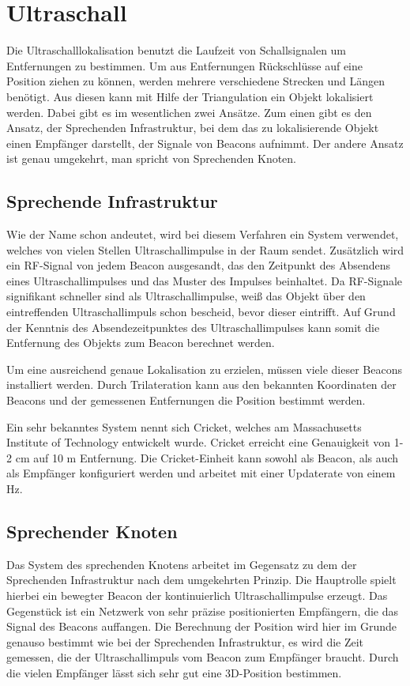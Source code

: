 \chapter{Ultraschall}
Die Ultraschalllokalisation benutzt die Laufzeit von Schallsignalen um
Entfernungen zu bestimmen. Um aus Entfernungen Rückschlüsse auf eine
Position ziehen zu können, werden mehrere verschiedene Strecken und Längen
benötigt. Aus diesen kann mit Hilfe der Triangulation ein Objekt lokalisiert
werden. Dabei gibt es im wesentlichen zwei Ansätze. Zum einen gibt es den
Ansatz, der \dq Sprechenden Infrastruktur\dq, bei dem das zu lokalisierende Objekt
einen Empfänger darstellt, der Signale von Beacons aufnimmt. Der andere
Ansatz ist genau umgekehrt, man spricht von \dq Sprechenden Knoten\dq.

\section{Sprechende Infrastruktur}
Wie der Name schon andeutet, wird bei diesem Verfahren ein System verwendet,
welches von vielen Stellen Ultraschallimpulse in der Raum sendet. Zusätzlich
wird ein RF-Signal von jedem Beacon ausgesandt, das den Zeitpunkt des
Absendens eines Ultraschallimpulses und das Muster des Impulses beinhaltet.
Da RF-Signale signifikant schneller sind als Ultraschallimpulse, weiß das
Objekt über den eintreffenden Ultraschallimpuls schon bescheid, bevor dieser
eintrifft. Auf Grund der Kenntnis des Absendezeitpunktes des
Ultraschallimpulses kann somit die Entfernung des Objekts zum Beacon
berechnet werden.

Um eine ausreichend genaue Lokalisation zu erzielen, müssen viele dieser
Beacons installiert werden. Durch Trilateration kann aus den bekannten
Koordinaten der Beacons und der gemessenen Entfernungen die Position
bestimmt werden.

Ein sehr bekanntes System nennt sich Cricket, welches am Massachusetts
Institute of Technology entwickelt
wurde. Cricket erreicht eine Genauigkeit von 1-2 cm auf 10 m Entfernung.
Die Cricket-Einheit kann sowohl als Beacon, als auch als Empfänger
konfiguriert werden und arbeitet mit einer Updaterate von einem Hz.

\section{Sprechender Knoten}
Das System des \dq sprechenden Knotens\dq{} arbeitet im Gegensatz zu dem der
\dq Sprechenden Infrastruktur\dq{} nach dem umgekehrten Prinzip. Die
Hauptrolle spielt hierbei ein bewegter Beacon der kontinuierlich
Ultraschallimpulse erzeugt. Das Gegenstück ist ein Netzwerk von sehr präzise
positionierten Empfängern, die das Signal des Beacons auffangen. Die
Berechnung der Position wird hier im Grunde genauso bestimmt wie bei der
\dq Sprechenden Infrastruktur\dq{}, es wird die Zeit gemessen, die der
Ultraschallimpuls vom Beacon zum Empfänger braucht. Durch die vielen
Empfänger lässt sich sehr gut eine 3D-Position bestimmen.

